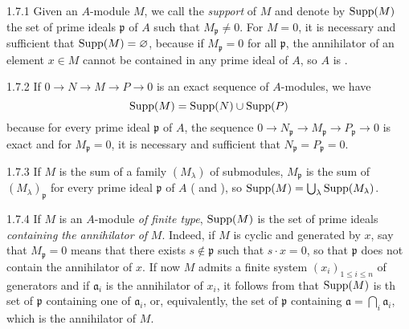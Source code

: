 \documentclass[../main.tex]{subfiles}
\begin{document}
\begin{env}{1.7.1}
Given an $A$-module $M$, we call the \emph{support} of $M$ and denote by $\operatorname{Supp}(M)$
the set of prime ideals $\mathfrak{p}$ of $A$ such that $M_\mathfrak{p}\neq 0$. For $M=0$, it
is necessary and sufficient that $\operatorname{Supp}(M)=\varnothing$, because if $M_\mathfrak{p}=0$ for all
$\mathfrak{p}$, the annihilator of an element $x\in M$ cannot be contained in any prime
ideal of $A$, so $A$ is .
\end{env}

\begin{env}{1.7.2}
If $0\to N\to M\to P\to 0$ is an exact sequence of $A$-modules, we have
\[
  \operatorname{Supp}(M)=\operatorname{Supp}(N)\cup\operatorname{Supp}(P)
\]
because for every prime ideal $\mathfrak{p}$ of $A$, the sequence
${0\to N_\mathfrak{p}\to M_\mathfrak{p}\to P_\mathfrak{p}\to 0}$ is exact  and for
$M_\mathfrak{p}=0$, it is necessary and sufficient that $N_\mathfrak{p}=P_\mathfrak{p}=0$.
\end{env}

\begin{env}{1.7.3}
If $M$ is the sum of a family $(M_\lambda)$ of submodules, $M_\mathfrak{p}$ is the sum
of $(M_\lambda)_\mathfrak{p}$ for every prime ideal $\mathfrak{p}$ of $A$ ( and ),
so $\operatorname{Supp}(M)=\bigcup_\lambda\operatorname{Supp}(M_\lambda)$.
\end{env}

\begin{env}{1.7.4}
If $M$ is an $A$-module \emph{of finite type}, $\operatorname{Supp}(M)$ is the set of prime
ideals \emph{containing the annihilator of} $M$. Indeed, if $M$ is cyclic and
generated by $x$, say that $M_\mathfrak{p}=0$ means that there exists $s\not\in\mathfrak{p}$
such that $s\cdot x=0$, so that $\mathfrak{p}$ does not contain the annihilator of $x$.
If now $M$ admits a finite system $(x_i)_{1\leq i\leq n}$ of generators and if
$\mathfrak{a}_i$ is the annihilator of $x_i$, it follows from  that $\operatorname{Supp}(M)$
is th set of $\mathfrak{p}$ containing one of $\mathfrak{a}_i$, or, equivalently, the
set of $\mathfrak{p}$ containing $\mathfrak{a}=\bigcap_i\mathfrak{a}_i$, which is the annihilator
of $M$.
\end{env}
\end{document}

